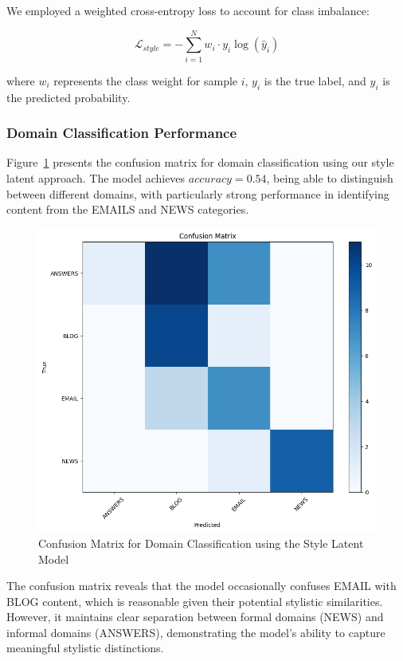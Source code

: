 \documentclass[twocolumn]{article}
\begin{document}
We employed a weighted cross-entropy loss to account for class imbalance:

\begin{equation}
\mathcal{L}_{style} = -\sum_{i=1}^{N} w_i \cdot y_i \log(\hat{y}_i)
\end{equation}

where $w_i$ represents the class weight for sample $i$, $y_i$ is the true label, and $\hat{y}_i$ is the predicted probability.

\subsubsection{Domain Classification Performance}
Figure~\ref{fig:domain-confusion} presents the confusion matrix for domain classification using our style latent approach. The model achieves $accuracy=0.54$, being able to distinguish between different domains, with particularly strong performance in identifying content from the EMAILS and NEWS categories.

\begin{figure} [H]
    \centering
    \includegraphics[width=0.8\linewidth]{figures/4_confusion.png}
    \caption{Confusion Matrix for Domain Classification using the Style Latent Model}
    \label{fig:domain-confusion}
\end{figure}

The confusion matrix reveals that the model occasionally confuses EMAIL with BLOG content, which is reasonable given their potential stylistic similarities. However, it maintains clear separation between formal domains (NEWS) and informal domains (ANSWERS), demonstrating the model's ability to capture meaningful stylistic distinctions.
\end{document}
